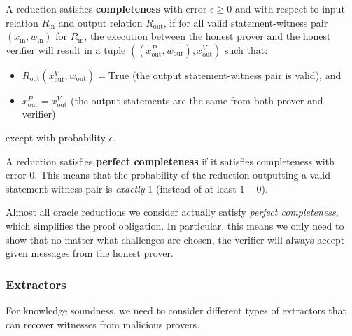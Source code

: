 \begin{definition}[Completeness]
    \label{def:completeness}
    A reduction satisfies \textbf{completeness} with error $\epsilon \geq 0$ and with respect to
    input relation $R_{\text{in}}$ and output relation $R_{\text{out}}$, if for all valid statement-witness pair
    $(x_{\text{in}}, w_{\text{in}})$ for $R_{\text{in}}$, the execution between the honest prover and the honest verifier
    will result in a tuple $((x_{\text{out}}^P, w_{\text{out}}), x_{\text{out}}^V)$ such that:
    \begin{itemize}
        \item $R_{\text{out}}(x_{\text{out}}^V, w_{\text{out}}) = \text{True}$ (the output statement-witness pair is valid), and
        \item $x_{\text{out}}^P = x_{\text{out}}^V$ (the output statements are the same from both prover and verifier)
    \end{itemize}
    except with probability $\epsilon$.
\end{definition}

\begin{definition}
    \label{def:perfect_completeness}
    A reduction satisfies \textbf{perfect completeness} if it satisfies completeness with error $0$.
    This means that the probability of the reduction outputting a valid statement-witness pair is
    \emph{exactly} 1 (instead of at least $1 - 0$).
\end{definition}

Almost all oracle reductions we consider actually satisfy \emph{perfect completeness}, which
simplifies the proof obligation. In particular, this means we only need to show that no matter what challenges are chosen, the verifier will always accept given messages from the honest prover.

\subsubsection{Extractors}

For knowledge soundness, we need to consider different types of extractors that can recover witnesses from malicious provers.

